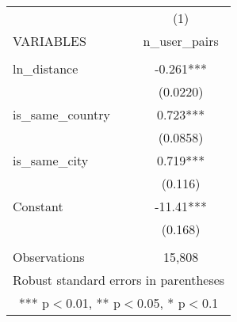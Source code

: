 \begin{tabular}{lc} \hline
 & (1) \\
VARIABLES & n\_user\_pairs \\ \hline
 &  \\
ln\_distance & -0.261*** \\
 & (0.0220) \\
is\_same\_country & 0.723*** \\
 & (0.0858) \\
is\_same\_city & 0.719*** \\
 & (0.116) \\
Constant & -11.41*** \\
 & (0.168) \\
 &  \\
 Observations & 15,808 \\ \hline
\multicolumn{2}{c}{ Robust standard errors in parentheses} \\
\multicolumn{2}{c}{ *** p$<$0.01, ** p$<$0.05, * p$<$0.1} \\
\end{tabular}
